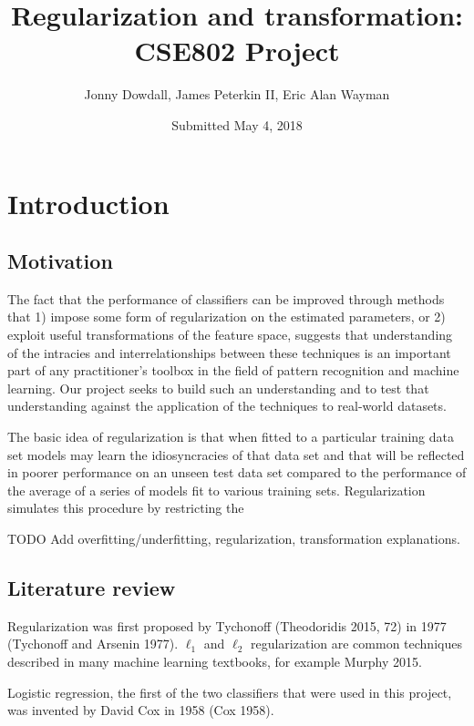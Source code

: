 \documentclass[letterpaper, 11pt]{article}
\begin{document}
\renewcommand{\arraystretch}{1.1}

\title{Regularization and transformation:\\CSE802 Project}
\author{Jonny Dowdall, James Peterkin II, Eric Alan Wayman}
\date{Submitted May 4, 2018}
\maketitle

\section{Introduction}

\subsection{Motivation}

The fact that the performance of classifiers can be improved through methods that 1) impose some form of regularization on the estimated parameters, or 2) exploit useful transformations of the feature space, suggests that understanding of the intracies and interrelationships between these techniques is an important part of any practitioner's toolbox in the field of pattern recognition and machine learning. Our project seeks to build such an understanding and to test that understanding against the application of the techniques to real-world datasets.

The basic idea of regularization is that when fitted to a particular training data set models may learn the idiosyncracies of that data set and that will be reflected in poorer performance on an unseen test data set compared to the performance of the average of a series of models fit to various training sets. Regularization simulates this procedure by restricting the 

TODO Add overfitting/underfitting, regularization, transformation explanations.

\subsection{Literature review}

Regularization was first proposed by Tychonoff (Theodoridis 2015, 72) in 1977 (Tychonoff and Arsenin 1977). $\ell_1$ and $\ell_2$ regularization are common techniques described in many machine learning textbooks, for example Murphy 2015.

Logistic regression, the first of the two classifiers that were used in this project, was invented by David Cox in 1958 (Cox 1958).
\end{document}
